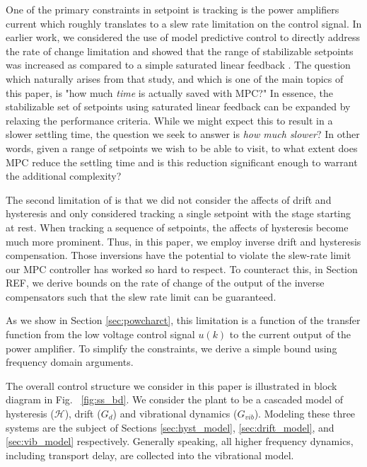 \documentclass[journal,twocolumn,twoside]{IEEEtran}
\begin{document}
One of the primary constraints in setpoint is tracking is the power amplifiers current which roughly translates to a slew rate limitation on the control signal. In earlier work, we considered the use of model predictive control to directly address the rate of change limitation and showed that the range of stabilizable setpoints was increased as compared to a simple saturated linear feedback \cite{braker_application_2017}. The question which naturally arises from that study, and which is one of the main topics of this paper, is "how much \emph{time} is actually saved with MPC?" In essence, the stabilizable set of setpoints using saturated linear feedback can be expanded by relaxing the performance criteria. While we might expect this to result in a slower settling time, the question we seek to answer is \emph{how much slower}? In other words, given a range of setpoints we wish to be able to visit, to what extent does MPC reduce the settling time and is this reduction significant enough to warrant the additional complexity?

The second limitation of \cite{braker_application_2017} is that we did not consider the affects of drift and hysteresis and only considered tracking a single setpoint with the stage starting at rest. When tracking a sequence of setpoints, the affects of hysteresis become much more prominent. Thus, in this paper, we employ inverse drift and hysteresis compensation. Those inversions have the potential to violate the slew-rate limit our MPC controller has worked so hard to respect. To counteract this, in Section REF, we derive bounds on the rate of change of the output of the inverse compensators such that the slew rate limit can be guaranteed.

As we show in Section \ref{sec:powcharct}, this limitation is a function of the transfer function from the low voltage control signal $u(k)$ to the current output of the power amplifier. To simplify the constraints, we derive a simple bound using frequency domain arguments.

The overall control structure we consider in this paper is illustrated in block diagram in Fig. ~\ref{fig:ss_bd}. We consider the plant to be a cascaded model of hysteresis ($\mathcal{H}$),  drift ($G_d$) and vibrational dynamics ($G_{vib}$). Modeling these three systems are the subject of Sections \ref{sec:hyst_model}, \ref{sec:drift_model}, and \ref{sec:vib_model} respectively. Generally speaking, all higher frequency dynamics, including transport delay, are collected into the vibrational model.
\end{document}
